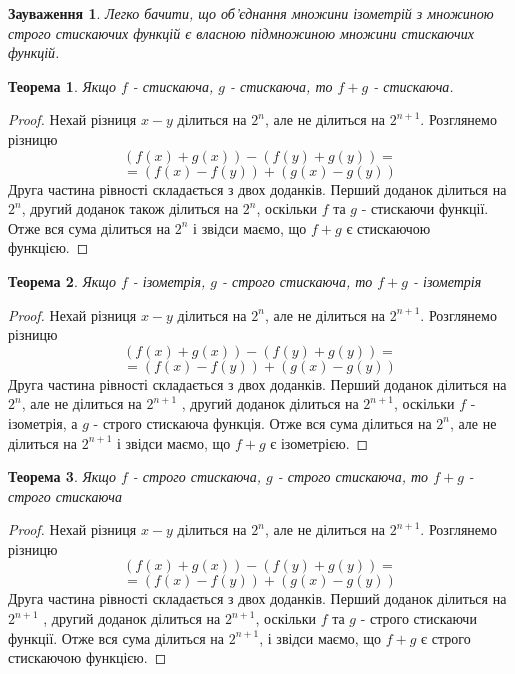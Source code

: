 \documentclass[a4paper,12pt]{article} \usepackage{a4wide}
\numberwithin{equation}{subsection}
\newtheorem{theorem}{Теорема}[subsection]
\newtheorem{remark}{Зауваження}[subsection]
\begin{document}
   \begin{remark}
     Легко бачити, що об'єднання множини ізометрій з множиною строго
     стискаючих функцій є власною підмножиною множини стискаючих
     функцій.

   \end{remark}




   \begin{theorem}Якщо $f$ - стискаюча, $g$ - стискаюча, то $f+g$ -
     стискаюча.
   \end{theorem}
   \begin{proof} Нехай різниця $x-y$ ділиться на $2^n$, але не
     ділиться на $2^{n+1}$. Розглянемо різницю
  $$(f(x)+g(x))-(f(y)+g(y))=$$ $$=(f(x)-f(y))+(g(x)-g(y))$$
  Друга частина рівності складається з двох доданків. Перший доданок
  ділиться на $2^n$, другий доданок також ділиться на $2^{n}$,
  оскільки $f$ та $g$ - стискаючи функції. Отже вся сума ділиться на
  $2^n$ і звідси маємо, що $f+g$ є стискаючою функцією.
\end{proof}


\begin{theorem}Якщо $f$ - ізометрія, $g$ - строго стискаюча, то $f+g$
  - ізометрія
\end{theorem}
\begin{proof} Нехай різниця $x-y$ ділиться на $2^n$, але не ділиться
  на $2^{n+1}$. Розглянемо різницю
  $$(f(x)+g(x))-(f(y)+g(y))=$$ $$=(f(x)-f(y))+(g(x)-g(y))$$
  Друга частина рівності складається з двох доданків. Перший доданок
  ділиться на $2^n$, але не ділиться на $2^{n+1}$ , другий доданок
  ділиться на $2^{n+1}$, оскільки $f$ - ізометрія, а $g$ - строго
  стискаюча функція. Отже вся сума ділиться на $2^n$, але не ділиться
  на $2^{n+1}$ і звідси маємо, що $f+g$ є ізометрією.
\end{proof}


\begin{theorem}Якщо $f$ - строго стискаюча, $g$ - строго стискаюча, то
  $f+g$ - строго стискаюча
\end{theorem}

\begin{proof} Нехай різниця $x-y$ ділиться на $2^n$, але не ділиться
  на $2^{n+1}$. Розглянемо різницю
  $$(f(x)+g(x))-(f(y)+g(y))=$$ $$=(f(x)-f(y))+(g(x)-g(y))$$
  Друга частина рівності складається з двох доданків. Перший доданок
  ділиться на $2^{n+1}$ , другий доданок ділиться на $2^{n+1}$,
  оскільки $f$ та $g$ - строго стискаючи функції. Отже вся сума
  ділиться на $2^{n+1}$, і звідси маємо, що $f+g$ є строго стискаючою
  функцією.
\end{proof}
\end{document}
